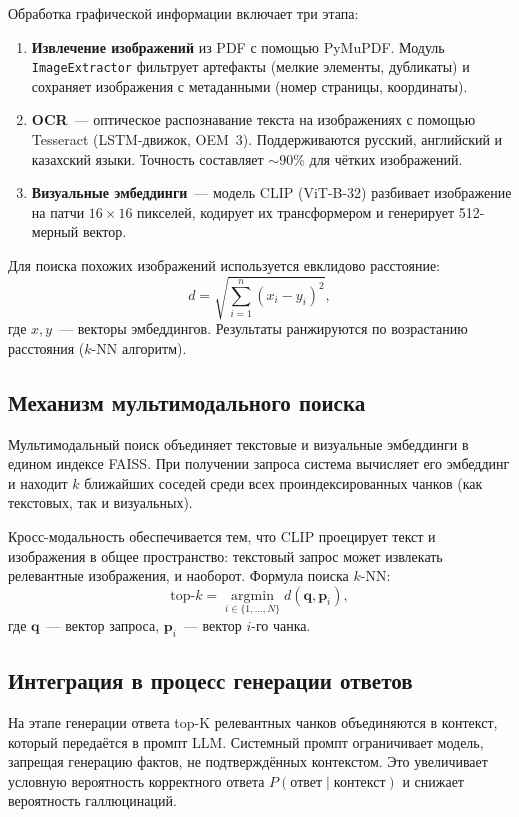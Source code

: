 \documentclass[a4paper,12pt]{article}
\begin{document}
Обработка графической информации включает три этапа:

\begin{enumerate}
    \item \textbf{Извлечение изображений} из PDF с помощью PyMuPDF. Модуль \texttt{ImageExtractor} фильтрует артефакты (мелкие элементы, дубликаты) и сохраняет изображения с метаданными (номер страницы, координаты).
    \item \textbf{OCR}~--- оптическое распознавание текста на изображениях с помощью Tesseract (LSTM-движок, OEM~3). Поддерживаются русский, английский и казахский языки. Точность составляет $\sim$90\% для чётких изображений.
    \item \textbf{Визуальные эмбеддинги}~--- модель CLIP (ViT-B-32) разбивает изображение на патчи $16 \times 16$ пикселей, кодирует их трансформером и генерирует 512-мерный вектор.
\end{enumerate}

Для поиска похожих изображений используется евклидово расстояние:
\[
d = \sqrt{\sum_{i=1}^{n} (x_i - y_i)^2},
\]
где $x, y$~--- векторы эмбеддингов. Результаты ранжируются по возрастанию расстояния ($k$-NN алгоритм).

\subsection{Механизм мультимодального поиска}

Мультимодальный поиск объединяет текстовые и визуальные эмбеддинги в едином индексе FAISS. При получении запроса система вычисляет его эмбеддинг и находит $k$ ближайших соседей среди всех проиндексированных чанков (как текстовых, так и визуальных).

Кросс-модальность обеспечивается тем, что CLIP проецирует текст и изображения в общее пространство: текстовый запрос может извлекать релевантные изображения, и наоборот. Формула поиска $k$-NN:
\[
\text{top-}k = \operatorname*{argmin}_{i \in \{1,\dots,N\}} d(\mathbf{q}, \mathbf{p}_i),
\]
где $\mathbf{q}$~--- вектор запроса, $\mathbf{p}_i$~--- вектор $i$-го чанка.

\subsection{Интеграция в процесс генерации ответов}

На этапе генерации ответа top-K релевантных чанков объединяются в контекст, который передаётся в промпт LLM. Системный промпт ограничивает модель, запрещая генерацию фактов, не подтверждённых контекстом. Это увеличивает условную вероятность корректного ответа $P(\text{ответ} \mid \text{контекст})$ и снижает вероятность галлюцинаций.
\end{document}
